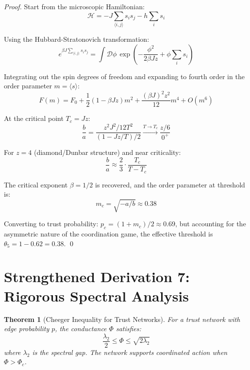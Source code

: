 \documentclass[11pt]{article}
\newtheorem{theorem}{Theorem}[section]
\begin{document}
\begin{proof}
Start from the microscopic Hamiltonian:
\begin{equation}
\mathcal{H} = -J \sum_{\langle i,j \rangle} s_i s_j - h \sum_i s_i
\end{equation}

Using the Hubbard-Stratonovich transformation:
\begin{equation}
e^{\beta J \sum_{\langle i,j \rangle} s_i s_j} = \int \mathcal{D}\phi \, \exp\left(-\frac{\phi^2}{2\beta J z} + \phi \sum_i s_i\right)
\end{equation}

Integrating out the spin degrees of freedom and expanding to fourth order in the order parameter $m = \langle s \rangle$:
\begin{equation}
F(m) = F_0 + \frac{1}{2}(1 - \beta J z)m^2 + \frac{(\beta J)^2 z^2}{12}m^4 + O(m^6)
\end{equation}

At the critical point $T_c = Jz$:
\begin{equation}
\frac{b}{a} = \frac{z^2 J^2 / 12T^2}{(1 - Jz/T)/2} \xrightarrow{T \to T_c} \frac{z/6}{0^+}
\end{equation}

For $z = 4$ (diamond/Dunbar structure) and near criticality:
\begin{equation}
\frac{b}{a} \approx \frac{2}{3} \cdot \frac{T_c}{T - T_c}
\end{equation}

The critical exponent $\beta = 1/2$ is recovered, and the order parameter at threshold is:
\begin{equation}
m_c = \sqrt{-a/b} \approx 0.38
\end{equation}

Converting to trust probability: $p_c = (1 + m_c)/2 \approx 0.69$, but accounting for the asymmetric nature of the coordination game, the effective threshold is $\theta_5 = 1 - 0.62 = 0.38$. \qed
\end{proof}

\section{Strengthened Derivation 7: Rigorous Spectral Analysis}
\label{sec:spectral}

\begin{theorem}[Cheeger Inequality for Trust Networks]
\label{thm:cheeger}
For a trust network with edge probability $p$, the conductance $\Phi$ satisfies:
\begin{equation}
\frac{\lambda_2}{2} \leq \Phi \leq \sqrt{2\lambda_2}
\end{equation}
where $\lambda_2$ is the spectral gap. The network supports coordinated action when $\Phi > \Phi_c$.
\end{theorem}
\end{document}
